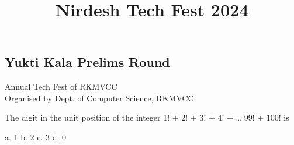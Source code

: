 \documentclass[a4paper, noaddpoints]{exam}
\title{Nirdesh Tech Fest 2024\vspace{-6.5ex}}
\date{}
\begin{document}
\pointformat{}
\maketitle
\begin{center}
\section*{Yukti Kala Prelims Round}
\end{center}
\begin{center}
\begin{large}
Annual Tech Fest of RKMVCC\\
\vspace{2mm}
Organised by Dept. of Computer Science, RKMVCC
\end{large}
\end{center}
\begin{questions}
	\question The digit in the unit position of the integer 1! + 2! + 3! + 4! + … 99! + 100! is \\
	\begin{oneparcheckboxes}
		\choice a. 1
		\choice b. 2
		\choice c. 3
		\choice d. 0
	\end{oneparcheckboxes}
\end{questions}
\end{document}

